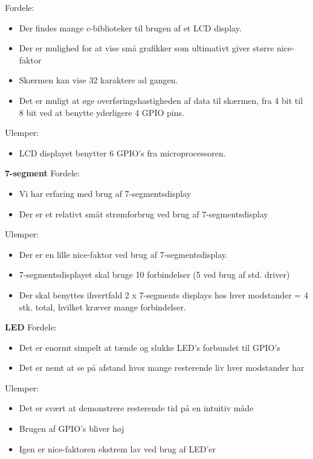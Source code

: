 Fordele: 
\begin{itemize}
\item Der findes mange c-biblioteker til brugen af et LCD display. 
\item Der er mulighed for at vise små grafikker som ultimativt giver større nice-faktor
\item Skærmen kan vise 32 karaktere ad gangen.
\item Det er muligt at øge overføringshastigheden af data til skærmen, fra 4 bit til 8 bit ved at benytte yderligere 4 GPIO pins.
\end{itemize}

Ulemper: 
\begin{itemize}
\item LCD displayet benytter 6 GPIO's fra microprocessoren.
\end{itemize}

\textbf{7-segment}
Fordele: 
\begin{itemize}
\item Vi har erfaring med brug af 7-segmentsdisplay
\item Der er et relativt småt strømforbrug ved brug af 7-segmentsdisplay 
\end{itemize}
Ulemper: 
\begin{itemize}
\item Der er en lille nice-faktor ved brug af 7-segmentsdisplay. 
\item 7-segmentsdisplayet skal bruge 10 forbindelser (5 ved brug af std. driver)
\item Der skal benyttes ihvertfald 2 x 7-segments displays hos hver modstander = 4 stk. total, hvilket kræver mange forbindelser. 
\end{itemize}

\textbf{LED} \newline
Fordele: 
\begin{itemize}
\item Det er enormt simpelt at tænde og slukke LED's forbundet til GPIO's
\item Det er nemt at se på afstand hvor mange resterende liv hver modstander har
\end{itemize}

Ulemper: 
\begin{itemize}
\item Det er svært at demonstrere resterende tid på en intuitiv måde
\item Brugen af GPIO's bliver høj
\item Igen er nice-faktoren ekstrem lav ved brug af LED'er
\end{itemize}

